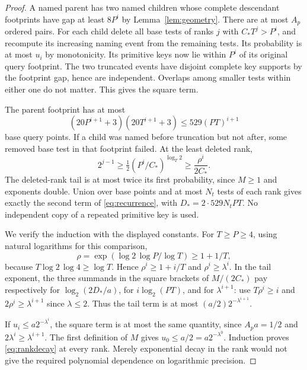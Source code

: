 \begin{proof}
A named parent has two named children whose complete descendant footprints have gap at least $8P^i$ by Lemma~\ref{lem:geometry}. There are at most $A_p$ ordered pairs. For each child delete all base tests of ranks $j$ with $C_*T^j>P^i$, and recompute its increasing naming event from the remaining tests. Its probability is at most $u_i$ by monotonicity. Its primitive keys now lie within $P^i$ of its original query footprint. The two truncated events have disjoint complete key supports by the footprint gap, hence are independent. Overlaps among smaller tests within either one do not matter. This gives the square term.

The parent footprint has at most
\[
 (20P^{i+1}+3)(20T^{i+1}+3)\le529(PT)^{i+1}
\]
base query points. If a child was named before truncation but not after, some removed base test in that footprint failed. At the least deleted rank,
\[
 2^{j-1}\ge\tfrac12(P^i/C_*)^{\log_T2}
 \ge\frac{\rho^i}{2C_*}.
\]
The deleted-rank tail is at most twice its first probability, since $M\ge1$ and exponents double. Union over base points and at most $N_t$ tests of each rank gives exactly the second term of \eqref{eq:recurrence}, with $D_*=2\cdot529N_tPT$. No independent copy of a repeated primitive key is used.

We verify the induction with the displayed constants. For $T\ge P\ge4$, using natural logarithms for this comparison,
\[
 \rho=\exp(\log2\,\log P/\log T)\ge1+1/T,
\]
because $T\log2\,\log4\ge\log T$. Hence $\rho^i\ge1+i/T$ and $\rho^i\ge\lambda^i$. In the tail exponent, the three summands in the square brackets of $M/(2C_*)$ pay respectively for $\log_2(2D_*/a)$, for $i\log_2(PT)$, and for $\lambda^{i+1}$: use $T\rho^i\ge i$ and $2\rho^i\ge\lambda^{i+1}$ since $\lambda\le2$. Thus the tail term is at most $(a/2)2^{-\lambda^{i+1}}$.

If $u_i\le a2^{-\lambda^i}$, the square term is at most the same quantity, since $A_pa=1/2$ and $2\lambda^i\ge\lambda^{i+1}$. The first definition of $M$ gives $u_0\le a/2=a2^{-\lambda^0}$. Induction proves \eqref{eq:rankdecay} at every rank. Merely exponential decay in the rank would not give the required polynomial dependence on logarithmic precision.
\end{proof}

